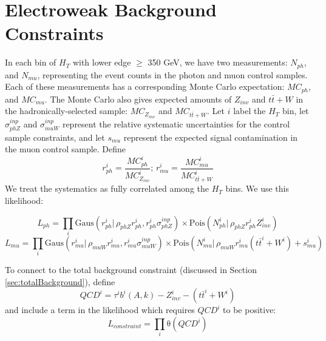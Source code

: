 \section{Electroweak Background Constraints}
In each bin of $H_T$ with lower edge $\ge$ 350 GeV, we have two measurements: $N_{ph}$, and $N_{mu}$,
representing the event counts in the photon and muon control samples.  Each of these measurements has a 
corresponding Monte Carlo expectation: $MC_{ph}$, and $MC_{mu}$.  The Monte Carlo also gives
expected amounts of $Z_{inv}$ and $t\bar{t}+W$ in the hadronically-selected sample: $MC_{Z_{inv}}$ and $MC_{t\bar{t}+W}$.
Let $i$ label the $H_T$ bin, let $\sigma_{phZ}^{inp}$ and $\sigma_{muW}^{inp}$ represent the relative 
systematic uncertainties for the control sample constraints, and let $s_{mu}$ represent the expected signal contamination in the muon control sample.
Define 
\begin{equation}
r_{ph}^i = \frac{MC_{ph}^i}{MC_{Z_{inv}}^i};\, r_{mu}^i = \frac{MC_{mu}^i}{MC_{t\bar{t}+W}^i}
\end{equation}
We treat the systematics as fully correlated among the $H_T$ bins.  We use this likelihood:

\begin{equation}
\label{eq:photonOption1}
L_{ph}=\prod_i \mathrm{Gaus}( r_{ph}^i |\,\rho_{phZ} r_{ph}^i, r_{ph}^i \sigma_{phZ}^{inp}) \times \mathrm{Pois}(N_{ph}^i |\, \rho_{phZ} r_{ph}^{i} Z_{inv}^{i})
\end{equation}
\begin{equation}
L_{mu}=\prod_i \mathrm{Gaus}( r_{mu}^i |\,\rho_{muW} r_{mu}^i, r_{mu}^i \sigma_{muW}^{inp}) \times \mathrm{Pois}(N_{mu}^i |\, \rho_{muW} r_{mu}^{i} (t\bar{t}^i+W^i) + s_{mu}^i)
\end{equation}

To connect to the total background constraint (discussed in Section \ref{sec:totalBackground}), define
\begin{equation}
QCD^{i} = \tau^i b^{i}(A,k) - Z_{inv}^{i} - (t\bar{t}^i+W^i)
\end{equation}
and include a term in the likelihood which requires $QCD^{i}$ to be positive:
\begin{equation}
L_{constraint}=\prod_i \mathrm{\theta}(QCD^{i})
\end{equation}

